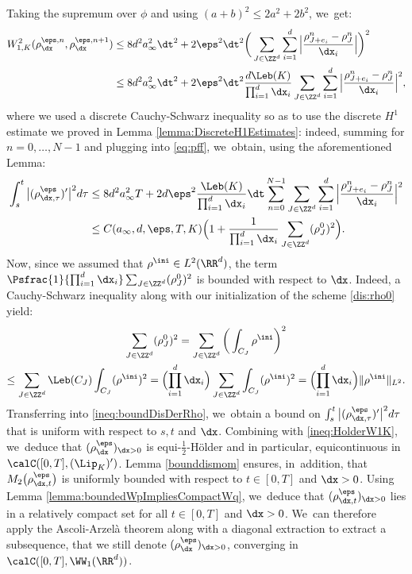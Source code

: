 Taking the supremum over $\phi$ and using $(a + b)^2 \leq 2a^2 + 2b^2$, we~get:
\begin{align*}
W_{1,K}^2(\rho_{\dx}^{\eps,n}, \rho_{\dx}^{\eps,n+1}) & \leq 8d^2 a_\infty^2 \dt^2 + 2\eps^2 \dt^2 \bigg(\sum_{J \in \ZZ^d} \sum_{i=1}^{d} \Big|\frac{\rho_{J+e_i}^{n} - \rho_J^{n}}{\dx_i}\Big|\bigg)^2 \\
& \leq 8d^2 a_\infty^2 \dt^2 + 2 \eps^2 \dt^2 \frac{d \Leb(K)}{\prod_{i=1}^d \dx_i} \sum_{J \in \ZZ^d} \sum_{i=1}^{d} \Big|\frac{\rho_{J+e_i}^{n} - \rho_J^{n}}{\dx_i}\Big|^2,
\end{align*}
where we used a discrete Cauchy-Schwarz inequality so as to use the discrete $H^1$ estimate we proved in Lemma \ref{lemma:DiscreteH1Estimates}: indeed, summing for $n=0,\ldots, N-1$ and plugging into \eqref{eq:pff}, we~obtain, using the aforementioned Lemma:
\begin{equation}\label{ineq:boundDisDerRho}
\begin{aligned}
\int_s^t \big|(\rho_{\dx,\tau}^\eps)'\big|^2 d\tau & \leq 8d^2 a_\infty^2 T + 2 d \eps^2 \frac{\Leb(K)}{\prod_{i=1}^d \dx_i} \dt \sum_{n=0}^{N-1} \sum_{J \in \ZZ^d} \sum_{i=1}^{d} \Big|\frac{\rho_{J+e_i}^{n} - \rho_J^{n}}{\dx_i}\Big|^2 \\
& \leq C(a_\infty,d, \eps, T, K) \Big(1 + \frac{1}{\prod_{i=1}^d \dx_i}\sum_{J\in\ZZ^d}(\rho_J^0)^2 \Big).
\end{aligned}
\end{equation}
Now, since we assumed that $\rho^{\ini} \in L^2(\RR^d)$, the term $\Psfrac{1}{\prod_{i=1}^d \dx_i}\sum_{J\in\ZZ^d}(\rho_J^0)^2$ is bounded with respect to $\dx$. Indeed, a Cauchy-Schwarz inequality along with our initialization of the scheme \eqref{dis:rho0} yield:
\begin{multline*}
\sum_{J\in\ZZ^d}(\rho_J^0)^2 = \sum_{J\in\ZZ^d} \bigg(\int_{C_J} \rho^{\ini}\bigg)^2 \\
\leq \sum_{J\in\ZZ^d} \Leb(C_J) \int_{C_J}(\rho^{\ini})^2 = \Bigl(\prod_{i=1}^d \dx_i\Bigr) \sum_{J\in\ZZ^d} \int_{C_J}(\rho^{\ini})^2 = \Bigl(\prod_{i=1}^d \dx_i\Bigr) \|\rho^{\ini}\|_{L^2}.
\end{multline*}
Transferring into \eqref{ineq:boundDisDerRho}, we~obtain a bound on $\int_s^t \big|(\rho_{\dx,\tau}^\eps)'\big|^2 d\tau$ that is uniform with respect to $s, t$ and $\dx$. Combining with \eqref{ineq:HolderW1K}, we~deduce that $(\rho_{\dx}^\eps)_{\dx > 0}$ is equi-$\frac 12$\nobreakdash-Hölder and in particular, equicontinuous in $\calC([0,T], (\Lip_K)')$. Lemma \ref{bounddismom} ensures, in~addition, that $M_2\big(\rho_{\dx,t}^\eps\big)$ is uniformly bounded with respect to $t \in [0,T]$ and $\dx>0$. Using Lemma \ref{lemma:boundedWpImpliesCompactWq}, we~deduce that $(\rho_{\dx,t}^\eps)_{\dx > 0}$ lies in a relatively compact set for all $t \in [0,T]$ and $\dx>0$. We~can therefore apply the Ascoli-Arzelà theorem along with a diagonal extraction to extract a subsequence, that we still denote $(\rho_{\dx}^\eps)_{\dx > 0}$, converging in
$\calC([0,T], \WW_1(\RR^d))$.


